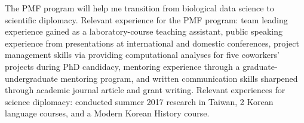 

\begin{cventries}


\fontsize{10pt}{1em}\bodyfontlight\upshape\color{black}\justify
The PMF program will help me transition from biological data science to scientific diplomacy. Relevant experience for the PMF program: team leading experience gained as a laboratory-course teaching assistant, public speaking experience from presentations at international and domestic conferences, project management skills via providing computational analyses for five coworkers' projects during PhD candidacy, mentoring experience through a graduate-undergraduate mentoring program, and written communication skills sharpened through academic journal article and grant writing. Relevant experiences for science diplomacy: conducted summer 2017 research in Taiwan, 2 Korean language courses, and a Modern Korean History course.
    
\vspace{-2.0mm}
\end{cventries}
